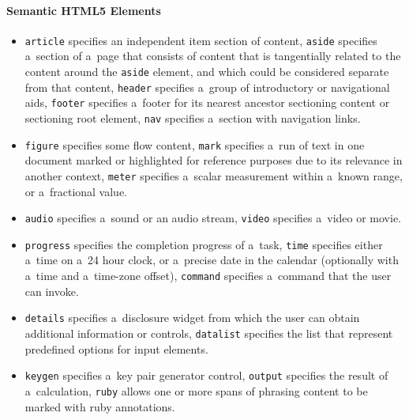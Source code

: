 \paragraph{Semantic HTML5 Elements}
\begin{itemize}
\item \texttt{article} specifies an independent item section of content,
\texttt{aside} specifies a~section of a~page that consists of content that is tangentially related
to the content around the \texttt{aside} element, and which could be considered separate from that content,
\texttt{header} specifies a~group of introductory or navigational aids,
\texttt{footer} specifies a~footer for its nearest ancestor sectioning content or sectioning root element,
\texttt{nav} specifies a~section with navigation links.
\item \texttt{figure} specifies some flow content,
\texttt{mark} specifies a~run of text in one document marked or highlighted for reference purposes
due to its relevance in another context, \texttt{meter} specifies a~scalar measurement within
a~known range, or a~fractional value.
\item \texttt{audio} specifies a~sound or an audio stream, \texttt{video} specifies a~video or movie.
\item \texttt{progress} specifies the completion progress of a~task,
\texttt{time} specifies either a~time on a~24 hour clock,
or a~precise date in the calendar (optionally with a~time and a~time-zone offset),
\texttt{command} specifies a~command that the user can invoke.
\item \texttt{details} specifies a~disclosure widget
from which the user can obtain additional information or controls,
\texttt{datalist} specifies the list that represent predefined options for input elements.
\item \texttt{keygen} specifies a~key pair generator control,
\texttt{output} specifies the result of a~calculation,
\texttt{ruby} allows one or more spans of phrasing content to be marked with ruby annotations.
\end{itemize}

